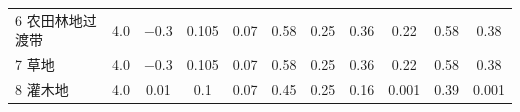 \begin{landscape}
\begin{table}[htbp]
\begin{tabular}{@{}lcccccccccc@{}}
    6 农田林地过渡带      & 4.0        & \num{ -0.3  }                                                                       & 0.105                                                                                                           & 0.07                                                                                                            & 0.58                                                                                                            & 0.25                                                                                                            & 0.36                                                                                                            & 0.22                                                                                                            & 0.58                                                                                                            & 0.38                                                                                                            \\
    7 草地           & 4.0        & \num{ -0.3  }                                                                       & 0.105                                                                                                           & 0.07                                                                                                            & 0.58                                                                                                            & 0.25                                                                                                            & 0.36                                                                                                            & 0.22                                                                                                            & 0.58                                                                                                            & 0.38                                                                                                            \\
    8 灌木地          & 4.0        & \num{ 0.01  }                                                                       & 0.1                                                                                                             & 0.07                                                                                                            & 0.45                                                                                                            & 0.25                                                                                                            & 0.16                                                                                                            & 0.001                                                                                                           & 0.39                                                                                                            & 0.001                                                                                                           \\

\end{tabular}
\end{table}
\end{landscape}
